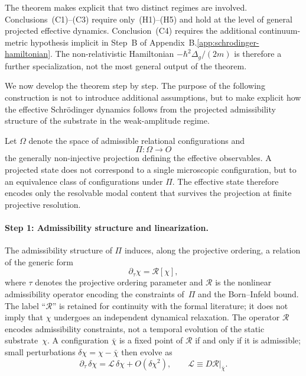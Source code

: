     \begin{remark}
      The theorem makes explicit that two distinct regimes are involved.
      Conclusions~(C1)--(C3) require only~(H1)--(H5) and hold at the level of general
      projected effective dynamics.
      Conclusion~(C4) requires the additional continuum-metric hypothesis implicit in
      Step~B of Appendix~B.\ref{app:schrodinger-hamiltonian}.
      The non-relativistic Hamiltonian $-\hbar^2\Delta_g/(2m)$ is therefore a further
      specialization, not the most general output of the theorem.
    \end{remark}

    We now develop the theorem step by step.
    The purpose of the following construction is not to introduce additional assumptions,
    but to make explicit how the effective Schr\"odinger dynamics follows from the
    projected admissibility structure of the substrate in the weak-amplitude regime.

    Let $\Omega$ denote the space of admissible relational configurations and
    \[
      \Pi : \Omega \to O
    \]
    the generally non-injective projection defining the effective observables.
    A projected state does not correspond to a single microscopic configuration, but to an
    equivalence class of configurations under $\Pi$.
    The effective state therefore encodes only the resolvable modal content that survives the
    projection at finite projective resolution.

    \paragraph{Step 1: Admissibility structure and linearization.}

      The admissibility structure of $\Pi$ induces, along the projective ordering,
      a relation of the generic form
      \[
        \partial_{\tau}\chi = \mathcal{R}[\chi],
      \]
      where $\tau$ denotes the projective ordering parameter and $\mathcal{R}$ is the
      nonlinear admissibility operator encoding the constraints of~$\Pi$ and the
      Born--Infeld bound.
      The label ``$\mathcal{R}$'' is retained for continuity with the formal literature;
      it does not imply that $\chi$ undergoes an independent dynamical relaxation.
      The operator $\mathcal{R}$ encodes admissibility constraints, not a temporal
      evolution of the static substrate~$\chi$.
      A configuration $\bar\chi$ is a fixed point of $\mathcal{R}$ if and only if it is
      admissible; small perturbations $\delta\chi = \chi - \bar\chi$ then evolve as
      \[
        \partial_\tau\,\delta\chi = \mathcal{L}\,\delta\chi + O(\delta\chi^2),
        \qquad \mathcal{L} \equiv D\mathcal{R}\big|_{\bar\chi}.
      \]

